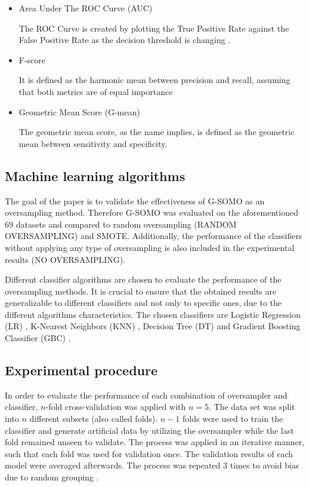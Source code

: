 \documentclass[parskip=full]{scrartcl}
\begin{document}
\begin{itemize}

	\renewcommand\labelitemi{--}

	\item Area Under The ROC Curve (AUC)
  
  	The ROC Curve is created by plotting the True Positive Rate against the
  	False Positive Rate as the decision threshold is changing \cite{Hand2009}.
	
	\item F-score
	  
	It is defined as the harmonic mean between precision and recall,
	assuming that both metrics are of equal importance \cite{Guo2018}
    
  	\item Geometric Mean Score (G-mean)
  
  	The geometric mean score, as the name implies, is defined as the geometric
  	mean between sensitivity and specificity.

\end{itemize}

\subsection{Machine learning algorithms} 

The goal of the paper is to validate the effectiveness of G-SOMO as an
oversampling method. Therefore G-SOMO was evaluated on the
aforementioned 69 datasets and compared to random
oversampling (RANDOM OVERSAMPLING) and SMOTE. Additionally, the performance of
the classifiers without applying any type of oversampling is also included in
the experimental results (NO OVERSAMPLING).

Different classifier algorithms are chosen to evaluate the performance of the
oversampling methods. It is crucial to ensure that the obtained results are
generalizable to different classifiers and not only to specific ones, due to the
different algorithms characteristics. The chosen classifiers are Logistic
Regression (LR) \cite{McCullagh1984}, K-Nearest Neighbors (KNN)
\cite{Suguna2010}, Decision Tree (DT) \cite{Salzberg1994} and Gradient Boosting
Classifier (GBC) \cite{Huang2007}.

\subsection{Experimental procedure}

In order to evaluate the performance of each combination of oversampler and
classifier, $n$-fold cross-validation was applied with $n = 5$. The data set was
split into $n$ different subsets (also called folds). $n-1$ folds were used to
train the classifier and generate artificial data by utilizing the oversampler
while the last fold remained unseen to validate. The process was applied in an
iterative manner, such that each fold was used for validation once. The
validation results of each model were averaged afterwards. The process was
repeated 3 times to avoid bias due to random grouping \cite{Japkowicz2013}.
\end{document}
